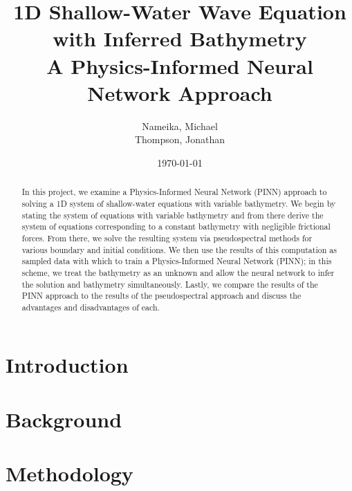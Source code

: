 \documentclass[letterpaper,12pt]{article}
\begin{document}
    \title{\vspace{1.0in}%
        1D Shallow-Water Wave Equation with Inferred Bathymetry\\
        \large A Physics-Informed Neural Network Approach
    }
    \author{%
        Nameika, Michael \\
        Thompson, Jonathan
    }
    \date{\today}

    \maketitle

    \vspace*{1.0in}

    \begin{abstract}
        In this project, we examine a Physics-Informed Neural Network (PINN) approach to solving a 1D system of 
        shallow-water equations with variable bathymetry. We begin by stating the system of equations with variable
        bathymetry and from there derive the system of equations corresponding to a constant bathymetry with negligible
        frictional forces. From there, we solve the resulting system via pseudospectral methods for various boundary
        and initial conditions. We then use the results of this computation as sampled data with which to train a 
        Physics-Informed Neural Network (PINN); in this scheme, we treat the bathymetry as an unknown and allow the 
        neural network to infer the solution and bathymetry simultaneously. Lastly, we compare the results of the PINN
        approach to the results of the pseudospectral approach and discuss the advantages and disadvantages of each.
    \end{abstract}

    \pagebreak

    \section{Introduction}\label{sec:introduction}
        

    \section{Background}\label{sec:background}
        

    \section{Methodology}\label{sec:proposed-methodology}
        
\end{document}
